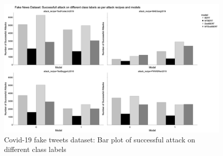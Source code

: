 \documentclass[%
	BCOR=8mm, %
	DIV=12,
	toc=bibliography, %
	toc=listof, %
	oneside, %
	egregdoesnotlikesansseriftitles, %
	]{scrbook}
\begin{document}
\begin{figure}[H]
    \centering
    \includegraphics[width=1.0\linewidth]{img/fakenews_class_attack_1.png}
    \caption[Bar plot of successful attack on different class labels for Covid-19 fake tweets dataset]{Covid-19 fake tweets dataset: Bar plot of successful attack on different class labels }
    \label{fig:classattack_fakenews}
\end{figure}
\end{document}
